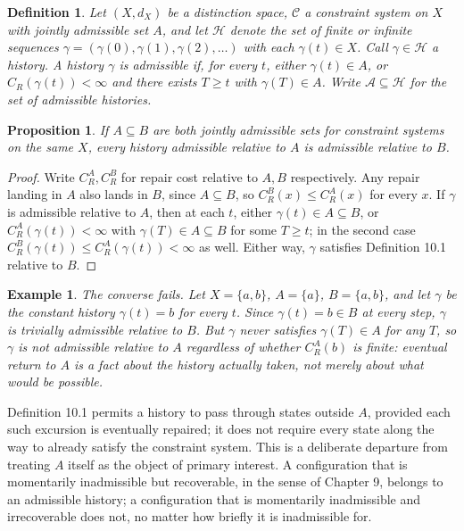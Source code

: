 \documentclass[11pt]{book}
\newtheorem{definition}[theorem]{Definition}
\newtheorem{proposition}[theorem]{Proposition}
\newtheorem{example}[theorem]{Example}
\begin{document}
\begin{definition}
Let $(X, d_X)$ be a distinction space, $\mathcal C$ a constraint system on $X$ with jointly admissible set $A$, and let $\mathcal H$ denote the set of finite or infinite sequences $\gamma = (\gamma(0), \gamma(1), \gamma(2), \dots)$ with each $\gamma(t) \in X$. Call $\gamma \in \mathcal H$ a \emph{history}. A history $\gamma$ is \emph{admissible} if, for every $t$, either $\gamma(t) \in A$, or $C_R(\gamma(t)) < \infty$ and there exists $T \geq t$ with $\gamma(T) \in A$. Write $\mathcal A \subseteq \mathcal H$ for the set of admissible histories.
\end{definition}

\begin{proposition}
If $A \subseteq B$ are both jointly admissible sets for constraint systems on the same $X$, every history admissible relative to $A$ is admissible relative to $B$.
\end{proposition}

\begin{proof}
Write $C_R^A, C_R^B$ for repair cost relative to $A, B$ respectively. Any repair landing in $A$ also lands in $B$, since $A \subseteq B$, so $C_R^B(x) \leq C_R^A(x)$ for every $x$. If $\gamma$ is admissible relative to $A$, then at each $t$, either $\gamma(t) \in A \subseteq B$, or $C_R^A(\gamma(t)) < \infty$ with $\gamma(T) \in A \subseteq B$ for some $T \geq t$; in the second case $C_R^B(\gamma(t)) \leq C_R^A(\gamma(t)) < \infty$ as well. Either way, $\gamma$ satisfies Definition 10.1 relative to $B$.
\end{proof}

\begin{example}
The converse fails. Let $X = \{a,b\}$, $A = \{a\}$, $B = \{a,b\}$, and let $\gamma$ be the constant history $\gamma(t) = b$ for every $t$. Since $\gamma(t) = b \in B$ at every step, $\gamma$ is trivially admissible relative to $B$. But $\gamma$ never satisfies $\gamma(T) \in A$ for any $T$, so $\gamma$ is not admissible relative to $A$ regardless of whether $C_R^A(b)$ is finite: eventual return to $A$ is a fact about the history actually taken, not merely about what would be possible.
\end{example}

Definition 10.1 permits a history to pass through states outside $A$, provided each such excursion is eventually repaired; it does not require every state along the way to already satisfy the constraint system. This is a deliberate departure from treating $A$ itself as the object of primary interest. A configuration that is momentarily inadmissible but recoverable, in the sense of Chapter 9, belongs to an admissible history; a configuration that is momentarily inadmissible and irrecoverable does not, no matter how briefly it is inadmissible for.
\end{document}
